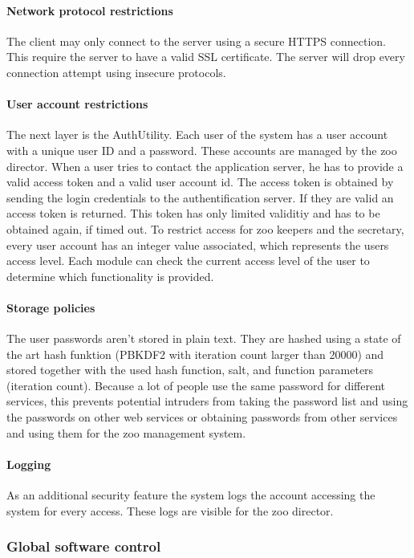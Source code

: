			\paragraph{Network protocol restrictions}
				The client may only connect to the server using a secure HTTPS connection. This require the server to have a valid SSL certificate. The server will drop every connection attempt using insecure protocols.
			\paragraph{User account restrictions}
				The next layer is the AuthUtility. Each user of the system has a user account with a unique user ID and a password. These accounts are managed by the zoo director. When a user tries to contact the application server, he has to provide a valid access token and a valid user account id. The access token is obtained by sending the login credentials to the authentification server. If they are valid an access token is returned. This token has only limited validitiy and has to be obtained again, if timed out. To restrict access for zoo keepers and the secretary, every user account has an integer value associated, which represents the users access level. Each module can check the current access level of the user to determine which functionality is provided.
			\paragraph{Storage policies}
				The user passwords aren't stored in plain text. They are hashed using a state of the art hash funktion (PBKDF2 with iteration count larger than 20000) and stored together with the used hash function, salt, and function parameters (iteration count). Because a lot of people use the same password for different services, this prevents potential intruders from taking the password list and using the passwords on other web services or obtaining passwords from other services and using them for the zoo management system.
			\paragraph{Logging}
				As an additional security feature the system logs the account accessing the system for every access. These logs are visible for the zoo director.
		\subsubsection{Global software control}
